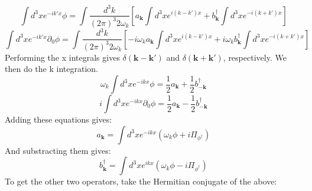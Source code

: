 \documentclass[12 pt]{article}
\begin{document}
\[  \int d^3 x e^{-ik'x} \phi = \int \frac{d^3 k}{(2\pi)^3 2\omega_k} \left[  a_{\mathbf{k}} \int d^3 x e^{i(k-k')x} + b^{\dagger}_{\mathbf{k}} \int d^3 x e^{-i(k+k')x}  \right]  \]
\[ \int d^3 x e^{-ik'x} \partial_0 \phi = \int \frac{d^3 k}{(2\pi)^3 2\omega_k} \left[-i\omega_{k}  a_{\mathbf{k}} \int d^3 x e^{i(k-k')x} + i\omega_k b^{\dagger}_{\mathbf{k}} \int d^3 x e^{-i(k+k')x}  \right] \]
Performing the x integrals gives $\delta (\mathbf{k}-\mathbf{k'})$ and $\delta (\mathbf{k}+\mathbf{k'})$, respectively. We then do the k integration.
\[ \omega_k  \int d^3 x e^{-ikx} \phi = \frac{1}{2} a_{\mathbf{k}} + \frac{1}{2} b^{\dagger}_{-\mathbf{k}}  \]
\[ i  \int d^3 x e^{-ikx} \partial_0 \phi = \frac{1}{2} a_{\mathbf{k}} - \frac{1}{2} b^{\dagger}_{-\mathbf{k}}  \]
Adding these equations gives:
\[  a_{\mathbf{k}} =  \int d^3 x e^{-ikx} \left(  \omega_k \phi + i \Pi_{\phi^{\dagger}}  \right)   \]
And substracting them gives:
\[  b^{\dagger}_{\mathbf{k}} =  \int d^3 x e^{ikx} \left(  \omega_k \phi - i \Pi_{\phi^{\dagger}}  \right)  \]
To get the other two operators, take the Hermitian conjugate of the above:
\end{document}
